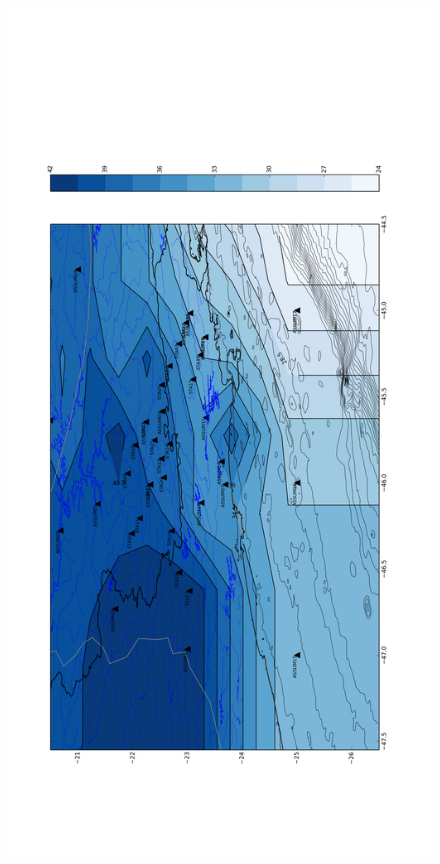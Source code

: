 \begin{figure}[!ht]
\centering
\includegraphics[scale=0.2]{Interpolacao_Linear.png}
\caption{}
\label{RF_perfil_NW}
\end{figure}

